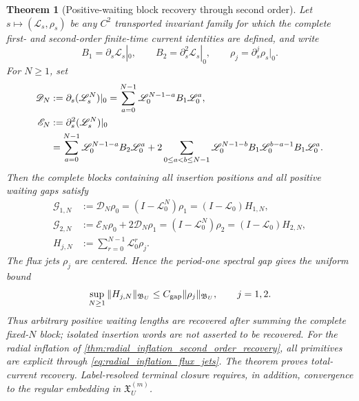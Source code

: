 \documentclass[11pt]{amsart}
\theoremstyle{compactplain}
\newtheorem{theorem}{Theorem}[section]
\theoremstyle{compactdefinition}
\theoremstyle{compactremark}
\newcommand{\Ltransfer}{\mathscr L}
\begin{document}
\begin{theorem}[Positive-waiting block recovery through second order]
\label{thm:blockwise_second_order_invariant_recovery}
Let \(s\mapsto(\Ltransfer_s,\rho_s)\) be any \(C^2\) transported invariant
family for which the complete first- and second-order finite-time current
identities are defined, and write
\[
 B_1=\partial_s\Ltransfer_s|_0,\qquad
 B_2=\partial_s^2\Ltransfer_s|_0,\qquad
 \rho_j=\partial_s^j\rho_s|_0.
\]
For \(N\ge1\), set
\begin{align}
 \mathscr D_N
 &:=\partial_s(\Ltransfer_s^N)|_0
   =\sum_{a=0}^{N-1}
     \Ltransfer_0^{N-1-a}B_1\Ltransfer_0^a,
 \label{eq:first_block_derivative_expansion}\\
 \mathscr E_N
 &:=\partial_s^2(\Ltransfer_s^N)|_0 \notag\\
 &=\sum_{a=0}^{N-1}
     \Ltransfer_0^{N-1-a}B_2\Ltransfer_0^a
   +2\sum_{0\le a<b\le N-1}
     \Ltransfer_0^{N-1-b}B_1
     \Ltransfer_0^{b-a-1}B_1\Ltransfer_0^a.
 \label{eq:second_block_derivative_expansion}
\end{align}
Then the complete blocks containing all insertion positions and all positive
waiting gaps satisfy
\begin{align}
 \mathscr G_{1,N}
 &:=\mathscr D_N\rho_0
   =(I-\Ltransfer_0^N)\rho_1
   =(I-\Ltransfer_0)H_{1,N},
 \label{eq:first_positive_waiting_block_recovery}\\
 \mathscr G_{2,N}
 &:=\mathscr E_N\rho_0+2\mathscr D_N\rho_1
   =(I-\Ltransfer_0^N)\rho_2
   =(I-\Ltransfer_0)H_{2,N},
 \label{eq:second_positive_waiting_block_recovery}\\
 H_{j,N}&:=\sum_{r=0}^{N-1}\Ltransfer_0^r\rho_j.
 \label{eq:block_recovery_primitive}
\end{align}
The flux jets \(\rho_j\) are centered.  Hence the period-one spectral gap gives
the uniform bound
\begin{equation}
\label{eq:uniform_block_recovery_primitive}
 \sup_{N\ge1}\|H_{j,N}\|_{\mathfrak B_U}
 \le C_{\rm gap}\|\rho_j\|_{\mathfrak B_U},
 \qquad j=1,2.
\end{equation}
Thus arbitrary positive waiting lengths are recovered after summing the
\emph{complete fixed-\(N\) block}; isolated insertion words are not asserted
to be recovered.  For the radial inflation of
\cref{thm:radial_inflation_second_order_recovery}, all primitives are explicit
through \eqref{eq:radial_inflation_flux_jets}.  The theorem proves total-current
recovery.  Label-resolved terminal closure requires, in addition, convergence
to the regular embedding in \(\mathfrak X_U^{(m)}\).
\end{theorem}
\end{document}
